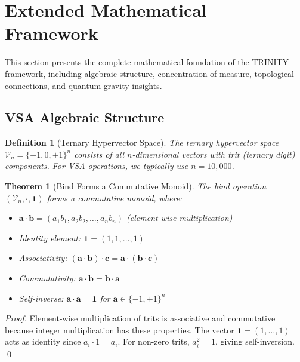 \documentclass[aps,prd,preprint,superscriptaddress,showpacs,nofootinbib,longbibliography]{revtex4-2}
\newtheorem{theorem}{Theorem}
\newtheorem{definition}{Definition}
\begin{document}
\section{Extended Mathematical Framework}
\label{sec:extended}

This section presents the complete mathematical foundation of the TRINITY framework, including algebraic structure, concentration of measure, topological connections, and quantum gravity insights.

\subsection{VSA Algebraic Structure}
\label{sec:vsa_algebra}

\begin{definition}[Ternary Hypervector Space]
\label{def:hypervector}
The \emph{ternary hypervector space} $\mathcal{V}_n = \{-1, 0, +1\}^n$ consists of all $n$-dimensional vectors with trit (ternary digit) components. For VSA operations, we typically use $n = 10{,}000$.
\end{definition}

\begin{theorem}[Bind Forms a Commutative Monoid]
\label{thm:bind_monoid}
The bind operation $(\mathcal{V}_n, \cdot, \mathbf{1})$ forms a commutative monoid, where:
\begin{itemize}
    \item $\mathbf{a} \cdot \mathbf{b} = (a_1 b_1, a_2 b_2, \ldots, a_n b_n)$ (element-wise multiplication)
    \item Identity element: $\mathbf{1} = (1, 1, \ldots, 1)$
    \item Associativity: $(\mathbf{a} \cdot \mathbf{b}) \cdot \mathbf{c} = \mathbf{a} \cdot (\mathbf{b} \cdot \mathbf{c})$
    \item Commutativity: $\mathbf{a} \cdot \mathbf{b} = \mathbf{b} \cdot \mathbf{a}$
    \item Self-inverse: $\mathbf{a} \cdot \mathbf{a} = \mathbf{1}$ for $\mathbf{a} \in \{-1, +1\}^n$
\end{itemize}
\end{theorem}

\begin{proof}
Element-wise multiplication of trits is associative and commutative because integer multiplication has these properties. The vector $\mathbf{1} = (1,\ldots,1)$ acts as identity since $a_i \cdot 1 = a_i$. For non-zero trits, $a_i^2 = 1$, giving self-inversion. \qed
\end{proof}
\end{document}

